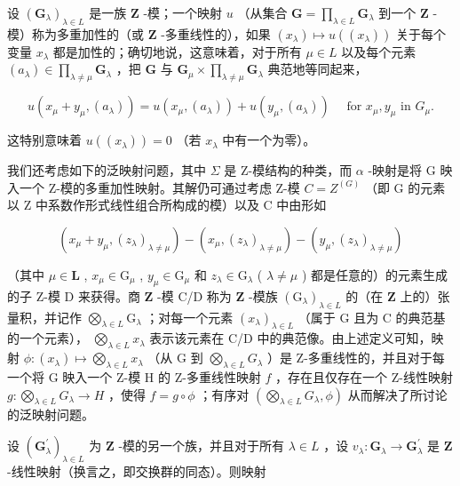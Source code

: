 设 \((\mathbf{G}_{\lambda})_{\lambda \in L}\) 是一族 \(\mathbf{Z}\) -模；一个映射 \(u\) （从集合 \(\mathbf{G} = \prod_{\lambda \in L} \mathbf{G}_{\lambda}\) 到一个 \(\mathbf{Z}\) -模）称为多重加性的（或 \(\mathbf{Z}\) -多重线性的），如果 \((x_{\lambda}) \mapsto u((x_{\lambda}))\) 关于每个变量 \(x_{\lambda}\) 都是加性的；确切地说，这意味着，对于所有 \(\mu \in L\) 以及每个元素 \((a_{\lambda}) \in \prod_{\lambda \neq \mu} \mathbf{G}_{\lambda}\) ，把 \(\mathbf{G}\) 与 \(\mathbf{G}_{\mu} \times \prod_{\lambda \neq \mu} \mathbf{G}_{\lambda}\) 典范地等同起来，

\[
u (x _ {\mu} + y _ {\mu}, (a _ {\lambda})) = u (x _ {\mu}, (a _ {\lambda})) + u (y _ {\mu}, (a _ {\lambda})) \quad \text { for } x _ {\mu}, y _ {\mu} \text { in } G _ {\mu}.\tag{24}
\]

这特别意味着 \(u((x_{\lambda})) = 0\) （若 \(x_{\lambda}\) 中有一个为零）。

我们还考虑如下的泛映射问题，其中 \(\Sigma\) 是 Z-模结构的种类，而 \(\alpha\) -映射是将 G 映入一个 Z-模的多重加性映射。其解仍可通过考虑 Z-模 \(C = Z^{(G)}\) （即 G 的元素以 Z 中系数作形式线性组合所构成的模）以及 C 中由形如

\[
\left(x _ {\mu} + y _ {\mu}, \left(z _ {\lambda}\right) _ {\lambda \neq \mu}\right) - \left(x _ {\mu}, \left(z _ {\lambda}\right) _ {\lambda \neq \mu}\right) - \left(y _ {\mu}, \left(z _ {\lambda}\right) _ {\lambda \neq \mu}\right)
\]

（其中 \(\mu \in \mathbf{L}\) , \(x_{\mu} \in \mathrm{G}_{\mu}\) , \(y_{\mu} \in \mathrm{G}_{\mu}\) 和 \(z_{\lambda} \in \mathrm{G}_{\lambda}\) ( \(\lambda \neq \mu\) ) 都是任意的）的元素生成的子 Z-模 D 来获得。商 \(\mathbf{Z}\) -模 C/D 称为 \(\mathbf{Z}\) -模族 \((\mathrm{G}_{\lambda})_{\lambda \in L}\) 的（在 \(\mathbf{Z}\) 上的）张量积，并记作 \(\bigotimes_{\lambda \in L} \mathrm{G}_{\lambda}\) ；对每一个元素 \((x_{\lambda})_{\lambda \in L}\) （属于 G 且为 C 的典范基的一个元素）， \(\bigotimes_{\lambda \in L} x_{\lambda}\) 表示该元素在 C/D 中的典范像。由上述定义可知，映射 \(\phi: (x_{\lambda}) \mapsto \bigotimes_{\lambda \in L} x_{\lambda}\) （从 G 到 \(\bigotimes_{\lambda \in L} G_{\lambda}\) ）是 Z-多重线性的，并且对于每一个将 G 映入一个 Z-模 H 的 Z-多重线性映射 \(f\) ，存在且仅存在一个 Z-线性映射 \(g: \bigotimes_{\lambda \in L} G_{\lambda} \to H\) ，使得 \(f = g \circ \phi\) ；有序对 \(\left( \bigotimes_{\lambda \in L} G_{\lambda}, \phi \right)\) 从而解决了所讨论的泛映射问题。

设 \((\mathbf{G}_{\lambda}^{\prime})_{\lambda \in L}\) 为 \(\mathbf{Z}\) -模的另一个族，并且对于所有 \(\lambda \in L\) ，设 \(v_{\lambda}: \mathbf{G}_{\lambda} \to \mathbf{G}_{\lambda}^{\prime}\) 是 \(\mathbf{Z}\) -线性映射（换言之，即交换群的同态）。则映射

